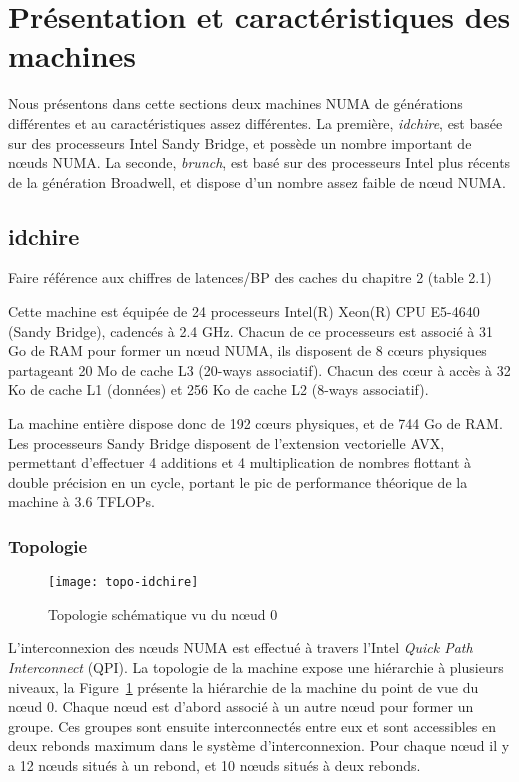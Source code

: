 \section{Présentation et caractéristiques des machines}\label{sec:contribs:machines}

Nous présentons dans cette sections deux machines NUMA de générations différentes et au caractéristiques assez différentes.
La première, \emph{idchire}, est basée sur des processeurs Intel Sandy Bridge, et possède un nombre important de nœuds NUMA.
La seconde, \emph{brunch}, est basé sur des processeurs Intel plus récents de la génération Broadwell, et dispose d'un nombre assez faible de nœud NUMA.

\subsection{idchire}\label{sec:contribs:machines:idchire}

\begin{todo}
  Faire référence aux chiffres de latences/BP des caches du chapitre 2 (table 2.1)
\end{todo}

Cette machine est équipée de 24 processeurs Intel(R) Xeon(R) CPU E5-4640 (Sandy Bridge), cadencés à 2.4 GHz.
Chacun de ce processeurs est associé à 31 Go de RAM pour former un nœud NUMA, ils disposent de 8 cœurs physiques partageant 20 Mo de cache L3 (20-ways associatif).
Chacun des cœur à accès à 32 Ko de cache L1 (données) et 256 Ko de cache L2 (8-ways associatif).

La machine entière dispose donc de 192 cœurs physiques, et de 744 Go de RAM.
Les processeurs Sandy Bridge disposent de l'extension vectorielle AVX, permettant d'effectuer 4 additions et 4 multiplication de nombres flottant à double précision en un cycle, portant le pic de performance théorique de la machine à 3.6 TFLOPs.

\subsubsection{Topologie}

\begin{figure}[ht]
  \centering
  \texttt{[image: topo-idchire]}
  \caption{Topologie schématique vu du nœud 0}\label{fig:contribs:machines:idchire:topo-liens}
\end{figure}

L'interconnexion des nœuds NUMA est effectué à travers l'Intel \emph{Quick Path Interconnect} (QPI).
La topologie de la machine expose une hiérarchie à plusieurs niveaux, la Figure~\ref{fig:contribs:machines:idchire:topo-liens} présente la hiérarchie de la machine du point de vue du nœud 0.
Chaque nœud est d'abord associé à un autre nœud pour former un groupe. Ces groupes sont ensuite interconnectés entre eux et sont accessibles en deux rebonds maximum dans le système d'interconnexion.
Pour chaque nœud il y a 12 nœuds situés à un rebond, et 10 nœuds situés à deux rebonds.

